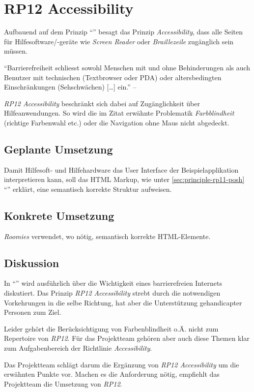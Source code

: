 \section{RP12 Accessibility}
\label{sec:principle-rp12-accessibility}
Aufbauend auf dem Prinzip ``'' besagt das Prinzip \emph{Accessibility}, dass alle Seiten für Hilfesoftware/-geräte wie \emph{Screen Reader} oder \emph{Braillezeile} zugänglich sein müssen.


``Barrierefreiheit schliesst sowohl Menschen mit und ohne Behinderungen als auch Benutzer mit technischen (Textbrowser oder PDA) oder altersbedingten Einschränkungen (Sehschwächen) [\ldots] ein.'' -- \cite{BarrierefreiesInternet}

\emph{RP12 Accessibility} beschränkt sich dabei auf Zugänglichkeit über Hilfeanwendungen. So wird die im Zitat erwähnte Problematik \emph{Farbblindheit} (richtige Farbenwahl etc.) oder die Navigation ohne Maus nicht abgedeckt.

\subsection*{Geplante Umsetzung}
Damit Hilfesoft- und Hilfehardware das User Interface der Beispielapplikation interpretieren kann, soll das HTML Markup, wie unter \ref{sec:principle-rp11-posh} ``'' erklärt, eine semantisch korrekte Struktur aufweisen.

\subsection*{Konkrete Umsetzung}

\emph{Roomies} verwendet, wo nötig, semantisch korrekte HTML-Elemente.

\subsection*{Diskussion}
In ``'' wird ausführlich über die Wichtigkeit eines barrierefreien Internets diskutiert. Das Prinzip \emph{RP12 Accessibility} strebt durch die notwendigen Vorkehrungen in die selbe Richtung, hat aber die Unterstützung gehandicapter Personen zum Ziel.

Leider gehört die Berücksichtigung von Farbenblindheit o.Ä. nicht zum Repertoire von \emph{RP12}. Für das Projektteam gehören aber auch diese Themen klar zum Aufgabenbereich der Richtlinie \emph{Accessibility}.

Das Projektteam schlägt darum die Ergänzung von \emph{RP12 Accessibility} um die erwähnten Punkte vor. Machen es die Anforderung nötig, empfiehlt das Projektteam die Umsetzung von \emph{RP12}.